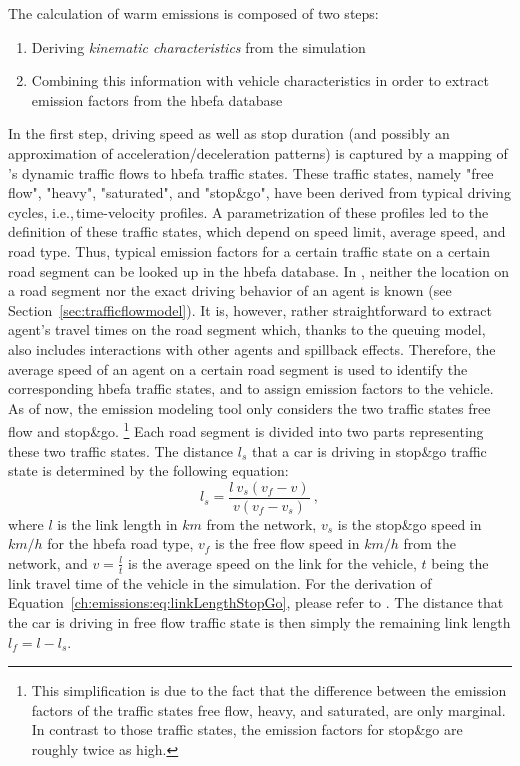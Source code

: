 The calculation of warm emissions is composed of two steps:
%
\begin{enumerate}
 \item Deriving \emph{kinematic characteristics} from the simulation
 \item Combining this information with vehicle characteristics in order to 
 extract emission factors from the \gls{hbefa} database
\end{enumerate}
%
In the first step, driving speed as well as stop duration (and possibly an 
approximation of acceleration/deceleration patterns) is captured by a 
mapping of 's dynamic traffic flows to \gls{hbefa} traffic states. 
These traffic states, namely "free flow", "heavy", "saturated", and "stop\&go", 
have been derived from typical driving cycles, i.e.,\,time-velocity profiles. 
A parametrization of these profiles led to the definition of these traffic 
states, which depend on speed limit, average speed, and road type. Thus, 
typical emission factors for a certain traffic state on a certain road segment 
can be looked up in the \gls{hbefa} database.
%
In , neither the location on a road segment nor the exact driving behavior of an agent is known (see Section~\ref{sec:trafficflowmodel}).
%
%
It is, however, rather straightforward to extract agent's travel times on the road segment which, thanks to the queuing model, also includes interactions with other agents and spillback effects.
%
Therefore, the average speed of an agent on a certain road segment is used to 
identify the corresponding \gls{hbefa} traffic states, and to assign emission 
factors to the vehicle. As of now, the emission modeling tool only considers 
the two traffic states free flow and stop\&go.%
% 
\footnote{
%
This simplification is due to the fact that the difference between the 
emission factors of the traffic states free flow, heavy, and saturated, are 
only marginal. In contrast to those traffic states, the emission factors for 
stop\&go are roughly twice as high.
%
}
%
Each road segment is divided into two parts representing these two 
traffic states. The distance $l_s$ that a car is driving in stop\&go traffic 
state is determined by the following equation:
%
\begin{equation}
l_s = \frac{l \ v_s  (v_f-v)}{v (v_f - v_s)} \ ,
\label{ch:emissions:eq:linkLengthStopGo}
\end{equation}
%
where $l$ is the link length in $km$ from the network, $v_s$ is the stop\&go speed in $km/h$ for the \gls{hbefa} road type, $v_f$ is the free flow speed in $km/h$ from the network, and $v=\frac{l}{t}$ is the average speed on the link for the vehicle, $t$ being the link travel time of the vehicle in the simulation. For the derivation of Equation~\ref{ch:emissions:eq:linkLengthStopGo}, please refer to \citet{Kickhoefer_PhDThesis_2014}. The distance that the car is driving in free flow traffic state is then simply the remaining link length $l_f = l - l_s$.
